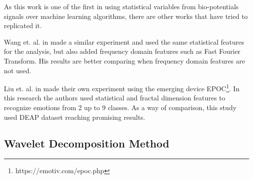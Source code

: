 \documentclass{sig-alternate}
\begin{document}
As this work is one of the first in using statistical variables from 
bio-potentials signals over machine learning algorithms, there are other works
that have tried to replicated it. 

Wang et. al. in \cite{wang2011} made a similar experiment
and used the same statistical features for the analysis, but also 
added frequency domain features such as Fast Fourier Transform. His
results are better comparing when frequency domain features are not used.

Liu et. al. in \cite{liu2013} made their own experiment using the emerging 
device EPOC\footnote{https://emotiv.com/epoc.php}. In this research the
authors used statistical and fractal dimension features to recognize 
emotions from 2 up to 9 classes. As a way of comparison, this study
used DEAP dataset reaching promising results.





\subsection{Wavelet Decomposition Method}	
\end{document}
